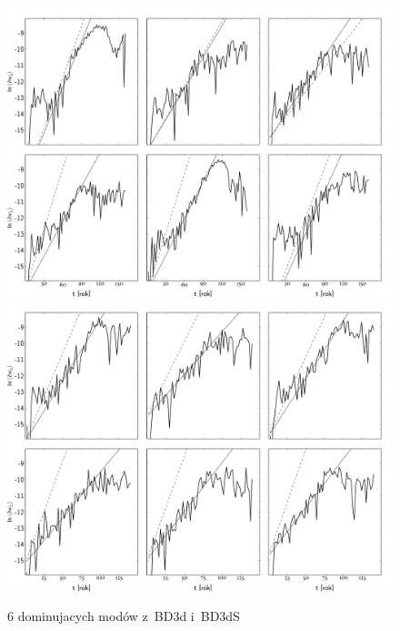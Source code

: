 %
\begin{figure}
   \centering
   \includegraphics[height=0.47\textheight]{figures/nosg_vlzd_growth}
   \includegraphics[height=0.47\textheight]{figures/sg_vlzd_growth}
   \caption{6 dominujacych modów z~BD3d i~BD3dS}
   \label{fig:modes3d}
\end{figure}
%   
